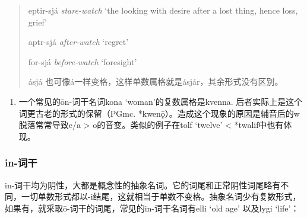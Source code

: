 \begin{quote}
  eptir-sjá \emph{stare-watch} `the looking with desire after a lost
  thing, hence loss, grief'

  aptr-sjá \emph{after-watch} `regret'

  for-sjá \emph{before-watch} `foresight'

  ásjá 也可像á一样变格，这样单数属格就是ásjár，其余形式没有区别。
\end{quote}

\begin{enumerate}
  \def\labelenumi{\arabic{enumi})}
  \setcounter{enumi}{1}
  \item
        一个常见的ōn-词干名词kona `woman'的复数属格是kvenna.
        后者实际上是这个词更古老的形式的保留（PGmc.
        *kwenǭ）。造成这个现象的原因是辅音后的w脱落常常导致e/a \textgreater{}
        o的音变。类似的例子在tolf `twelve' \textless{} *twalif中也有体现。
\end{enumerate}

\subsubsection{in-词干}\label{in-词干}

in-词干均为阴性，大都是概念性的抽象名词。它的词尾和正常阴性词尾略有不同，一切单数形式都以-i结尾，这就相当于单数不变格。抽象名词少有复数形式，如果有，就采取ō-词干的词尾，常见的in-词干名词有elli
`old age' 以及lygi `life'：

